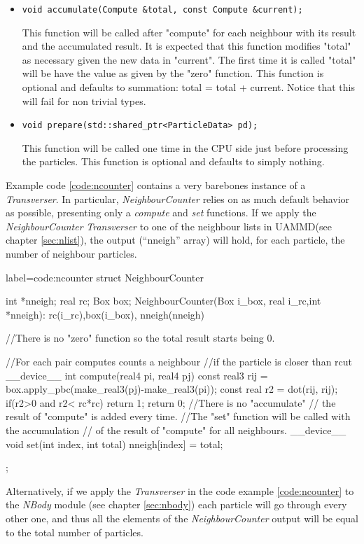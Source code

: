 \documentclass[ twoside,openright,titlepage,numbers=noenddot,%
headinclude,footinclude,cleardoublepage=empty,abstract=on,
BCOR=5mm,paper=a4,fontsize=11pt, dvipsnames
]{scrreprt}
\def\ucpp{uammd_cpp_lexer.py:UAMMDCppLexer -x}
\newcommand{\uammd}{\gls{UAMMD}\xspace}
\begin{document}
\begin{itemize}
 \item \texttt{void accumulate(Compute &total, const Compute &current);}

   
  This function will be called after "compute" for each neighbour with its result and the accumulated result.
  It is expected that this function modifies "total" as necessary given the new data in "current".
  The first time it is called "total" will be have the value as given by the "zero" function.
  This function is optional and defaults to summation: total = total + current. Notice that this will fail for non trivial types.
     
\item \texttt{void prepare(std::shared_ptr<ParticleData> pd);}

  
  This function will be called one time in the CPU side just before processing the particles.
  This function is optional and defaults to simply nothing.
 \end{itemize}

Example code \ref{code:ncounter} contains a very barebones instance of a \emph{Transverser}. In particular, \emph{NeighbourCounter} relies on as much default behavior as possible, presenting only a \emph{compute} and \emph{set} functions.
If we apply the \emph{NeighbourCounter} \emph{Transverser} to one of the neighbour lists in \uammd (see chapter \ref{sec:nlist}), the output (``nneigh'' array) will hold, for each particle, the number of neighbour particles.
\begin{code2}{label=code:ncounter}
struct NeighbourCounter{
  int *nneigh;
  real rc;
  Box box;
  NeighbourCounter(Box i_box, real i_rc,int *nneigh):
    rc(i_rc),box(i_box),
    nneigh(nneigh){}

  //There is no "zero" function so the total result starts being 0.
  
  //For each pair computes counts a neighbour 
  //if the particle is closer than rcut
  __device__ int compute(real4 pi, real4 pj){
    const real3 rij = box.apply_pbc(make_real3(pj)-make_real3(pi));
    const real r2 = dot(rij, rij);
    if(r2>0 and r2< rc*rc){
      return 1;
    }
    return 0;
  }
  //There is no "accumulate"
  // the result of "compute" is added every time.
  //The "set" function will be called with the accumulation
  // of the result of "compute" for all neighbours. 
  __device__ void set(int index, int total){
    nneigh[index] = total;
  }
};
\end{code2}
Alternatively, if we apply the \emph{Transverser} in the code example \ref{code:ncounter} to the \emph{NBody} module (see chapter \ref{sec:nbody}) each particle will go through every other one, and thus all the elements of the \emph{NeighbourCounter} output will be equal to the total number of particles.
\end{document}
